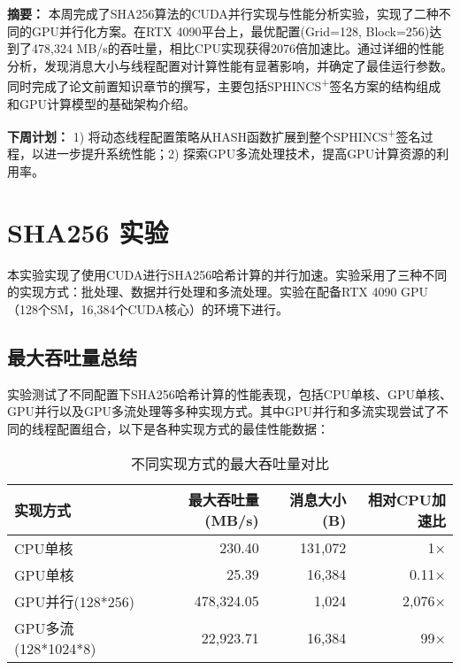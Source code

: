 \documentclass[report]{../../custom}
\begin{document}
\maketitle

\noindent \textbf{摘要：}
本周完成了SHA256算法的CUDA并行实现与性能分析实验，实现了二种不同的GPU并行化方案。在RTX 4090平台上，最优配置(Grid=128, Block=256)达到了478,324 MB/s的吞吐量，相比CPU实现获得2076倍加速比。通过详细的性能分析，发现消息大小与线程配置对计算性能有显著影响，并确定了最佳运行参数。同时完成了论文前置知识章节的撰写，主要包括SPHINCS\textsuperscript{+}签名方案的结构组成和GPU计算模型的基础架构介绍。

\vskip 0.5cm

\noindent \textbf{下周计划：} 1) 将动态线程配置策略从HASH函数扩展到整个SPHINCS\textsuperscript{+}签名过程，以进一步提升系统性能；2) 探索GPU多流处理技术，提高GPU计算资源的利用率。

\section{SHA256 实验}

本实验实现了使用CUDA进行SHA256哈希计算的并行加速。实验采用了三种不同的实现方式：批处理、数据并行处理和多流处理。实验在配备RTX 4090 GPU（128个SM，16,384个CUDA核心）的环境下进行。

\subsection{最大吞吐量总结}

实验测试了不同配置下SHA256哈希计算的性能表现，包括CPU单核、GPU单核、GPU并行以及GPU多流处理等多种实现方式。其中GPU并行和多流实现尝试了不同的线程配置组合，以下是各种实现方式的最佳性能数据：

\begin{table}[htbp]
\centering
\caption{不同实现方式的最大吞吐量对比}
\begin{tabular}{|l|r|r|r|}
\hline
实现方式 & 最大吞吐量 (MB/s) & 消息大小 (B) & 相对CPU加速比 \\
\hline
CPU单核 \cite{Wang2025} & 230.40 & 131,072 & 1× \\
GPU单核 \cite{Wang2025} & 25.39 & 16,384 & 0.11× \\
\hline
GPU并行(128*256) & 478,324.05 & 1,024 & 2,076× \\
\hline
GPU多流(128*1024*8) & 22,923.71 & 16,384 & 99× \\
\hline
\end{tabular}
\end{table}
\end{document}
